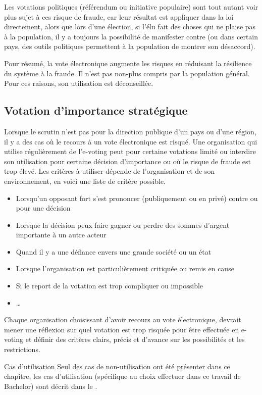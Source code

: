 \documentclass[../report]{subfiles}
\begin{document}
Les votations politiques (référendum ou initiative populaire) sont tout autant voir plus sujet à ces risque de fraude, 
car leur résultat est appliquer dans la loi directement, alors que lors d'une élection, si l'élu fait des choses qui ne
plaise pas à la population, il y a toujours la possibilité de manifester contre (ou dans certain pays, des outils politiques
permettent à la population de montrer son désaccord).

Pour résumé, la vote électronique augmente les risques en réduisant la résilience du système à la fraude. 
Il n'est pas non-plus compris par la population général. Pour ces raisons, son utilisation est déconseillée.

\subsection{Votation d'importance stratégique}

Lorsque le scrutin n'est pas pour la direction publique d'un pays ou d'une région, il y a des cas où le 
recours à un vote électronique est risqué.
Une organisation qui utilise régulièrement de l'e-voting peut pour certaine votations limité ou interdire
son utilisation pour certaine décision d'importance ou où le risque de fraude est trop élevé.
Les critères à utiliser dépende de l'organisation et de son environnement, en voici une liste de critère possible.
\begin{itemize}
	\item Lorsqu'un opposant fort s'est prononcer (publiquement ou en privé) contre ou pour une décision
	\item Lorsque la décision peux faire gagner ou perdre des sommes d'argent importante à un autre acteur
	\item Quand il y a une défiance envers une grande société ou un état
	\item Lorsque l'organisation est particulièrement critiquée ou remis en cause
	\item Si le report de la votation est trop compliquer ou impossible
	\item \dots
\end{itemize}

Chaque organisation choisissant d'avoir recours au vote électronique, devrait mener une réflexion sur quel
votation est trop risquée pour être effectuée en e-voting et définir des critères clairs, précis et d'avance
sur les possibilités et les restrictions.

\begin{nota}{Cas d'utilisation}
	Seul des cas de non-utilisation ont été présenter dans ce chapitre, les cas d'utilisation (spécifique 
	au choix effectuer dans ce travail de Bachelor) sont décrit dans le .
\end{nota}
\end{document}
